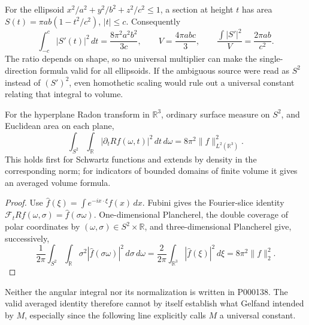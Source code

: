 \begin{example}\oursComputed
For the ellipsoid
\(x^2/a^2+y^2/b^2+z^2/c^2\leq1\), a section at height \(t\) has area
\(S(t)=\pi ab(1-t^2/c^2)\), \(|t|\leq c\). Consequently
\[
 \int_{-c}^{c}|S'(t)|^2\,dt=\frac{8\pi^2a^2b^2}{3c},\qquad
 V=\frac{4\pi abc}{3},\qquad
 \frac{\int|S'|^2}{V}=\frac{2\pi ab}{c^2}.
\]
The ratio depends on shape, so no universal multiplier can make the
single-direction formula valid for all ellipsoids. If the ambiguous source
were read as \(S^2\) instead of \((S')^2\), even homothetic scaling would
rule out a universal constant relating that integral to volume.
\end{example}

\begin{proposition}\ours
For the hyperplane Radon transform in \(\mathbb R^3\), ordinary surface
measure on \(S^2\), and Euclidean area on each plane,
\[
 \int_{S^2}\int_{\mathbb R}|\partial_t Rf(\omega,t)|^2\,dt\,d\omega
       =8\pi^2\|f\|_{L^2(\mathbb R^3)}^2.
\]
This holds first for Schwartz functions and extends by density in the
corresponding norm; for indicators of bounded domains of finite volume it
gives an averaged volume formula.
\end{proposition}

\begin{proof}
Use \(\widehat f(\xi)=\int e^{-ix\cdot\xi}f(x)\,dx\).
Fubini gives the Fourier-slice identity
\(\mathcal F_t Rf(\omega,\sigma)=\widehat f(\sigma\omega)\).
One-dimensional Plancherel, the double coverage of polar coordinates by
\((\omega,\sigma)\in S^2\times\mathbb R\), and three-dimensional
Plancherel give, successively,
\[
 \frac1{2\pi}\int_{S^2}\int_{\mathbb R}
       \sigma^2|\widehat f(\sigma\omega)|^2\,d\sigma\,d\omega
 =\frac2{2\pi}\int_{\mathbb R^3}|\widehat f(\xi)|^2\,d\xi
 =8\pi^2\|f\|_2^2.
\]
\end{proof}

Neither the angular integral nor its normalization is written in P000138.
The valid averaged identity therefore cannot by itself establish what
Gelfand intended by \(M\), especially since the following line explicitly
calls \(M\) a universal constant.
